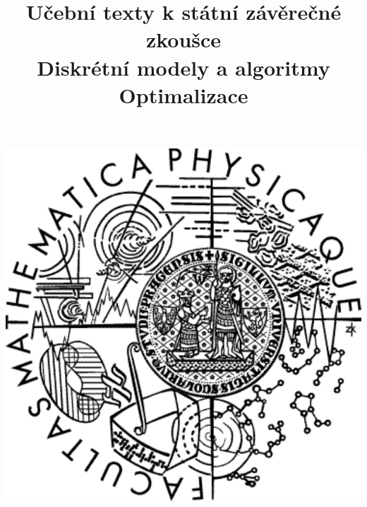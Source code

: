 \clearpage

\clearpage

\title{\LARGE Učební texty k státní závěrečné zkoušce \\ Diskrétní modely a algoritmy \\ Optimalizace}




\maketitle

\vspace{10mm}
\begin{center}
\includegraphics[scale=0.5]{../common/logo.pdf}
\end{center} 

\clearpage

\clearpage

\tableofcontents






